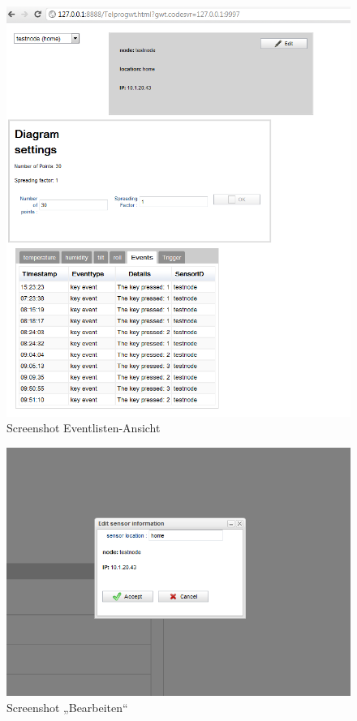 \documentclass[12pt,a4paper,twoside]{article}
\begin{document}
\begin{figure}[htbp]
   \centering
   \includegraphics[width=12cm]{fig/screen3.png}
   \caption{Screenshot Eventlisten-Ansicht}
   \label{screen3}
\end{figure}

\begin{figure}[htbp]
   \centering
   \includegraphics[width=12cm]{fig/screen4.png}
   \caption{Screenshot „Bearbeiten“}
   \label{screen4}
\end{figure}
  
\end{document}
